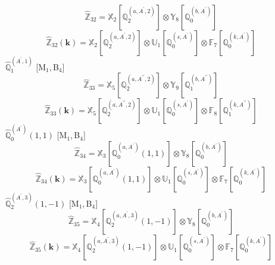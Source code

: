 \documentclass[fleqn,10pt,landscape]{article}
\begin{document}
\begin{itemize}
\begin{dmath*}
\hat{\mathbb{Z}}_{32}=\mathbb{X}_{2}[\mathbb{Q}_{2}^{(a,A^{\prime},2)}] \otimes\mathbb{Y}_{8}[\mathbb{Q}_{0}^{(b,A^{\prime})}]
\end{dmath*}
\begin{dmath*}
\hat{\mathbb{Z}}_{32}(\bm{k})=\mathbb{X}_{2}[\mathbb{Q}_{2}^{(a,A^{\prime},2)}] \otimes\mathbb{U}_{1}[\mathbb{Q}_{0}^{(s,A^{\prime})}] \otimes\mathbb{F}_{7}[\mathbb{Q}_{0}^{(k,A^{\prime})}]
\end{dmath*}
\vspace{4mm}
\noindent {} $\,\,\,\hat{\mathbb{Q}}_{1}^{(A^{\prime},1)}$ [M$_{1}$,\,B$_{4}$]
\begin{dmath*}
\hat{\mathbb{Z}}_{33}=\mathbb{X}_{5}[\mathbb{Q}_{2}^{(a,A^{\prime\prime},2)}] \otimes\mathbb{Y}_{9}[\mathbb{Q}_{1}^{(b,A^{\prime\prime})}]
\end{dmath*}
\begin{dmath*}
\hat{\mathbb{Z}}_{33}(\bm{k})=\mathbb{X}_{5}[\mathbb{Q}_{2}^{(a,A^{\prime\prime},2)}] \otimes\mathbb{U}_{1}[\mathbb{Q}_{0}^{(s,A^{\prime})}] \otimes\mathbb{F}_{8}[\mathbb{Q}_{1}^{(k,A^{\prime\prime})}]
\end{dmath*}
\vspace{4mm}
\noindent {} $\,\,\,\hat{\mathbb{Q}}_{0}^{(A^{\prime})}(1,1)$ [M$_{1}$,\,B$_{4}$]
\begin{dmath*}
\hat{\mathbb{Z}}_{34}=\mathbb{X}_{3}[\mathbb{Q}_{0}^{(a,A^{\prime})}(1,1)] \otimes\mathbb{Y}_{8}[\mathbb{Q}_{0}^{(b,A^{\prime})}]
\end{dmath*}
\begin{dmath*}
\hat{\mathbb{Z}}_{34}(\bm{k})=\mathbb{X}_{3}[\mathbb{Q}_{0}^{(a,A^{\prime})}(1,1)] \otimes\mathbb{U}_{1}[\mathbb{Q}_{0}^{(s,A^{\prime})}] \otimes\mathbb{F}_{7}[\mathbb{Q}_{0}^{(k,A^{\prime})}]
\end{dmath*}
\vspace{4mm}
\noindent {} $\,\,\,\hat{\mathbb{Q}}_{2}^{(A^{\prime},3)}(1,-1)$ [M$_{1}$,\,B$_{4}$]
\begin{dmath*}
\hat{\mathbb{Z}}_{35}=\mathbb{X}_{4}[\mathbb{Q}_{2}^{(a,A^{\prime},3)}(1,-1)] \otimes\mathbb{Y}_{8}[\mathbb{Q}_{0}^{(b,A^{\prime})}]
\end{dmath*}
\begin{dmath*}
\hat{\mathbb{Z}}_{35}(\bm{k})=\mathbb{X}_{4}[\mathbb{Q}_{2}^{(a,A^{\prime},3)}(1,-1)] \otimes\mathbb{U}_{1}[\mathbb{Q}_{0}^{(s,A^{\prime})}] \otimes\mathbb{F}_{7}[\mathbb{Q}_{0}^{(k,A^{\prime})}]
\end{dmath*}
\vspace{4mm}

\end{itemize}
\end{document}
